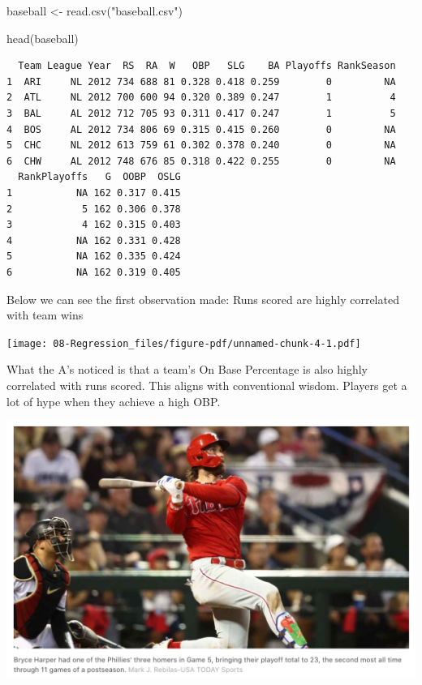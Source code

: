 \documentclass[
  letterpaper,
  DIV=11,
  numbers=noendperiod]{scrreprt}
\newenvironment{Shaded}{\begin{snugshade}}{\end{snugshade}}
\newcommand{\FunctionTok}[1]{\textcolor[rgb]{0.28,0.35,0.67}{#1}}
\newcommand{\NormalTok}[1]{\textcolor[rgb]{0.00,0.23,0.31}{#1}}
\newcommand{\OtherTok}[1]{\textcolor[rgb]{0.00,0.23,0.31}{#1}}
\newcommand{\StringTok}[1]{\textcolor[rgb]{0.13,0.47,0.30}{#1}}
\begin{document}
\begin{Shaded}
\begin{Highlighting}[]
\NormalTok{baseball }\OtherTok{\textless{}{-}} \FunctionTok{read.csv}\NormalTok{(}\StringTok{"baseball.csv"}\NormalTok{)}
\end{Highlighting}
\end{Shaded}

\begin{Shaded}
\begin{Highlighting}[]
\FunctionTok{head}\NormalTok{(baseball)}
\end{Highlighting}
\end{Shaded}

\begin{verbatim}
  Team League Year  RS  RA  W   OBP   SLG    BA Playoffs RankSeason
1  ARI     NL 2012 734 688 81 0.328 0.418 0.259        0         NA
2  ATL     NL 2012 700 600 94 0.320 0.389 0.247        1          4
3  BAL     AL 2012 712 705 93 0.311 0.417 0.247        1          5
4  BOS     AL 2012 734 806 69 0.315 0.415 0.260        0         NA
5  CHC     NL 2012 613 759 61 0.302 0.378 0.240        0         NA
6  CHW     AL 2012 748 676 85 0.318 0.422 0.255        0         NA
  RankPlayoffs   G  OOBP  OSLG
1           NA 162 0.317 0.415
2            5 162 0.306 0.378
3            4 162 0.315 0.403
4           NA 162 0.331 0.428
5           NA 162 0.335 0.424
6           NA 162 0.319 0.405
\end{verbatim}

Below we can see the first observation made: Runs scored are highly
correlated with team wins

\texttt{[image: 08-Regression\_files/figure-pdf/unnamed-chunk-4-1.pdf]}

What the A's noticed is that a team's On Base Percentage is also highly
correlated with runs scored. This aligns with conventional wisdom.
Players get a lot of hype when they achieve a high OBP.

\includegraphics{images/harper.png}
\end{document}
